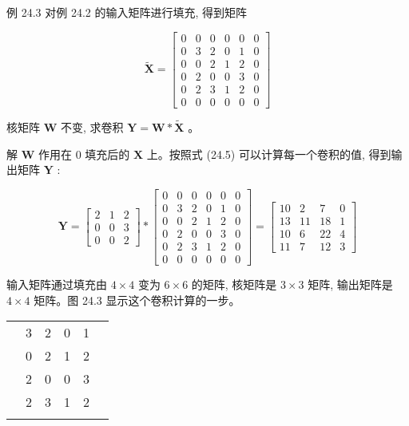 \documentclass[10pt]{article}
\begin{document}
例 24.3 对例 24.2 的输入矩阵进行填充, 得到矩阵

$$
\tilde{\boldsymbol{X}}=\left[\begin{array}{llllll}
0 & 0 & 0 & 0 & 0 & 0 \\
0 & 3 & 2 & 0 & 1 & 0 \\
0 & 0 & 2 & 1 & 2 & 0 \\
0 & 2 & 0 & 0 & 3 & 0 \\
0 & 2 & 3 & 1 & 2 & 0 \\
0 & 0 & 0 & 0 & 0 & 0
\end{array}\right]
$$

核矩阵 $\boldsymbol{W}$ 不变, 求卷积 $\boldsymbol{Y}=\boldsymbol{W} * \tilde{\boldsymbol{X}}$ 。

解 $\boldsymbol{W}$ 作用在 0 填充后的 $\boldsymbol{X}$ 上。按照式 (24.5) 可以计算每一个卷积的值, 得到输出矩阵 $\boldsymbol{Y}$ :

$$
\boldsymbol{Y}=\left[\begin{array}{lll}
2 & 1 & 2 \\
0 & 0 & 3 \\
0 & 0 & 2
\end{array}\right] *\left[\begin{array}{cccccc}
0 & 0 & 0 & 0 & 0 & 0 \\
0 & 3 & 2 & 0 & 1 & 0 \\
0 & 0 & 2 & 1 & 2 & 0 \\
0 & 2 & 0 & 0 & 3 & 0 \\
0 & 2 & 3 & 1 & 2 & 0 \\
0 & 0 & 0 & 0 & 0 & 0
\end{array}\right]=\left[\begin{array}{cccc}
10 & 2 & 7 & 0 \\
13 & 11 & 18 & 1 \\
10 & 6 & 22 & 4 \\
11 & 7 & 12 & 3
\end{array}\right]
$$

输入矩阵通过填充由 $4 \times 4$ 变为 $6 \times 6$ 的矩阵, 核矩阵是 $3 \times 3$ 矩阵, 输出矩阵是 $4 \times 4$ 矩阵。图 24.3 显示这个卷积计算的一步。

\begin{center}
\begin{tabular}{|l|l|l|l|l|l|}
\hline
 &  &  &  &  &  \\
\hline
 & 3 & 2 & 0 & 1 &  \\
\hline
 & 0 & 2 & 1 & 2 &  \\
\hline
 & 2 & 0 & 0 & 3 &  \\
\hline
 & 2 & 3 & 1 & 2 &  \\
\hline
 &  &  &  &  &  \\
\hline
\end{tabular}
\end{center}
\end{document}
